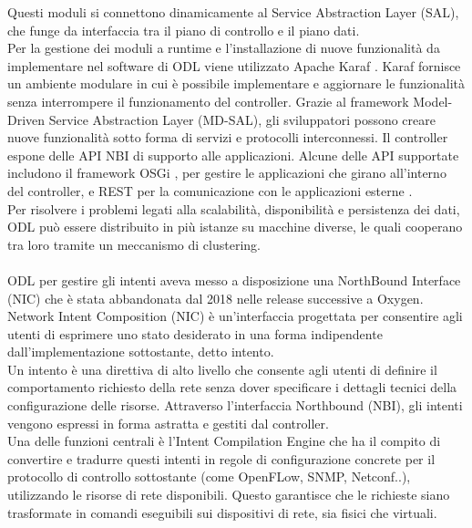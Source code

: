 Questi moduli si connettono dinamicamente al Service Abstraction Layer (SAL), che funge da interfaccia tra il piano di controllo e il piano dati.
\\Per la gestione dei moduli a runtime e l'installazione di nuove funzionalità da implementare nel software di ODL viene utilizzato Apache Karaf \cite{Apache}.
Karaf fornisce un ambiente modulare in cui è possibile implementare e aggiornare le funzionalità senza interrompere il funzionamento del controller.
Grazie al framework Model-Driven Service Abstraction Layer (MD-SAL), gli sviluppatori possono creare nuove funzionalità sotto forma di servizi e protocolli interconnessi.
Il controller espone delle API NBI di supporto alle applicazioni. Alcune delle API supportate includono il framework OSGi \cite{osgi}, per gestire le applicazioni che girano all'interno del controller,
e REST per la comunicazione con le applicazioni esterne \cite{tesiodl2}.
\\Per risolvere i problemi legati alla scalabilità, disponibilità e persistenza dei dati, ODL può essere distribuito in più istanze su macchine diverse, le quali cooperano tra loro tramite un meccanismo di clustering.
\\
\\ODL per gestire gli intenti aveva messo a disposizione una NorthBound Interface (NIC) che è stata abbandonata dal 2018 nelle release successive a Oxygen.
\\Network Intent Composition (NIC) \cite{nic} è un'interfaccia progettata per consentire agli utenti di esprimere uno stato desiderato in una forma indipendente dall'implementazione sottostante, detto intento. 
\\Un intento è una direttiva di alto livello che consente agli utenti di definire il comportamento richiesto della rete senza dover specificare i dettagli tecnici della configurazione delle risorse.
Attraverso l'interfaccia Northbound (NBI), gli intenti vengono espressi in forma astratta e gestiti dal controller.
\\Una delle funzioni centrali è l'Intent Compilation Engine che ha il compito di convertire e tradurre questi intenti in regole di configurazione concrete per il protocollo di controllo sottostante (come OpenFLow, SNMP, Netconf..), utilizzando le risorse di rete disponibili.
Questo garantisce che le richieste siano trasformate in comandi eseguibili sui dispositivi di rete, sia fisici che virtuali.
